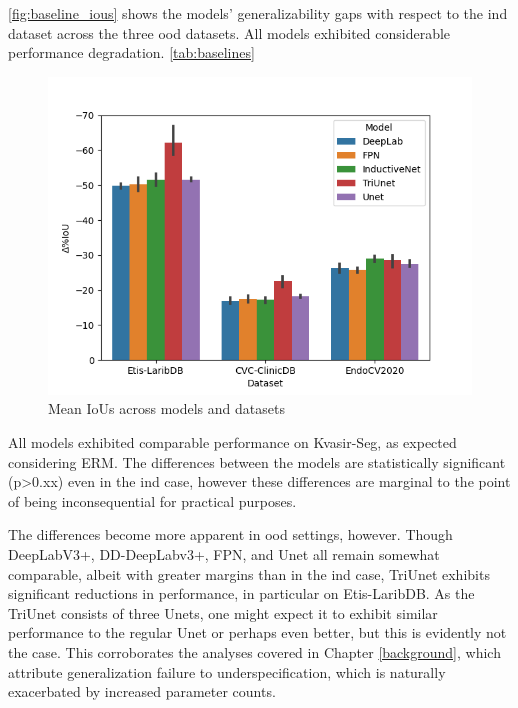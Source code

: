 \autoref{fig:baseline_ious} shows the models' generalizability gaps with respect to the \gls{ind} dataset across the three \gls{ood} datasets. All models exhibited considerable performance degradation. 
\autoref{tab:baselines}
    \begin{figure}
        \centering
        \includegraphics[width=\linewidth]{illustrations/delta_iou_baseline.png}
        \caption{Mean IoUs across models and datasets}
        \label{fig:baseline_ious}
    \end{figure}
    
    All models exhibited comparable performance on Kvasir-Seg, as expected considering ERM. The differences between the models are statistically significant (p>0.xx) even in the \gls{ind} case, however these differences are marginal to the point of being inconsequential for practical purposes. 
    
    The differences become more apparent in \gls{ood} settings, however. Though DeepLabV3+, DD-DeepLabv3+, FPN, and Unet all remain somewhat comparable, albeit with greater margins than in the \gls{ind} case, TriUnet exhibits significant reductions in performance, in particular on Etis-LaribDB. As the TriUnet consists of three Unets, one might expect it to exhibit similar performance to the regular Unet or perhaps even better, but this is evidently not the case. This corroborates the analyses covered in Chapter \ref{background}, which attribute generalization failure to underspecification, which is naturally exacerbated by increased parameter counts. 
    
